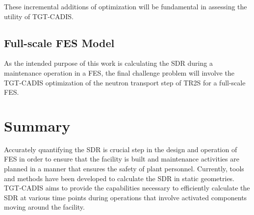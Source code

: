 These incremental additions of optimization will be fundamental in assessing the
utility of TGT-CADIS. 






\subsection{Full-scale FES Model} \label{sec:full_scale}
As the intended purpose of this work is  
calculating the SDR during a maintenance
operation in a FES, the final challenge problem will involve the
TGT-CADIS optimization of the neutron transport step of TR2S for a full-scale
FES.



\section{Summary}\label{sec:summary}
Accurately quantifying the SDR is crucial step in the design and operation of
FES in order to ensure that the facility is built and maintenance activities
are planned in a manner that ensures the safety of plant personnel.
Currently, tools and methods have been developed to calculate the SDR in static
geometries.
TGT-CADIS aims to provide the capabilities necessary to efficiently calculate
the SDR at various time points during operations that involve activated
components moving around the facility.
